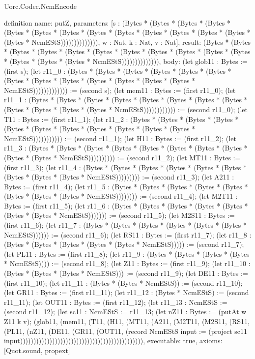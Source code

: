 \begin{lexlean}{Uorc.Codec.NcmEncode}
\begin{semanticmodule}
definition{
  name: putZ,
  parameters: [s : (Bytes * (Bytes * (Bytes * (Bytes * (Bytes * (Bytes * (Bytes * (Bytes * (Bytes * (Bytes * (Bytes * (Bytes * (Bytes * (Bytes * NcmEStS)))))))))))))), w : Nat, k : Nat, v : Nat],
  result: (Bytes * (Bytes * (Bytes * (Bytes * (Bytes * (Bytes * (Bytes * (Bytes * (Bytes * (Bytes * (Bytes * (Bytes * (Bytes * (Bytes * NcmEStS)))))))))))))),
  body: (let glob11 : Bytes := (first s); (let r11_0 : (Bytes * (Bytes * (Bytes * (Bytes * (Bytes * (Bytes * (Bytes * (Bytes * (Bytes * (Bytes * (Bytes * (Bytes * (Bytes * NcmEStS))))))))))))) := (second s); (let mem11 : Bytes := (first r11_0); (let r11_1 : (Bytes * (Bytes * (Bytes * (Bytes * (Bytes * (Bytes * (Bytes * (Bytes * (Bytes * (Bytes * (Bytes * (Bytes * NcmEStS)))))))))))) := (second r11_0); (let T11 : Bytes := (first r11_1); (let r11_2 : (Bytes * (Bytes * (Bytes * (Bytes * (Bytes * (Bytes * (Bytes * (Bytes * (Bytes * (Bytes * (Bytes * NcmEStS))))))))))) := (second r11_1); (let H11 : Bytes := (first r11_2); (let r11_3 : (Bytes * (Bytes * (Bytes * (Bytes * (Bytes * (Bytes * (Bytes * (Bytes * (Bytes * (Bytes * NcmEStS)))))))))) := (second r11_2); (let MT11 : Bytes := (first r11_3); (let r11_4 : (Bytes * (Bytes * (Bytes * (Bytes * (Bytes * (Bytes * (Bytes * (Bytes * (Bytes * NcmEStS))))))))) := (second r11_3); (let A211 : Bytes := (first r11_4); (let r11_5 : (Bytes * (Bytes * (Bytes * (Bytes * (Bytes * (Bytes * (Bytes * (Bytes * NcmEStS)))))))) := (second r11_4); (let M2T11 : Bytes := (first r11_5); (let r11_6 : (Bytes * (Bytes * (Bytes * (Bytes * (Bytes * (Bytes * (Bytes * NcmEStS))))))) := (second r11_5); (let M2S11 : Bytes := (first r11_6); (let r11_7 : (Bytes * (Bytes * (Bytes * (Bytes * (Bytes * (Bytes * NcmEStS)))))) := (second r11_6); (let RS11 : Bytes := (first r11_7); (let r11_8 : (Bytes * (Bytes * (Bytes * (Bytes * (Bytes * NcmEStS))))) := (second r11_7); (let PL11 : Bytes := (first r11_8); (let r11_9 : (Bytes * (Bytes * (Bytes * (Bytes * NcmEStS)))) := (second r11_8); (let Z11 : Bytes := (first r11_9); (let r11_10 : (Bytes * (Bytes * (Bytes * NcmEStS))) := (second r11_9); (let DE11 : Bytes := (first r11_10); (let r11_11 : (Bytes * (Bytes * NcmEStS)) := (second r11_10); (let GR11 : Bytes := (first r11_11); (let r11_12 : (Bytes * NcmEStS) := (second r11_11); (let OUT11 : Bytes := (first r11_12); (let r11_13 : NcmEStS := (second r11_12); (let sc11 : NcmEStS := r11_13; (let nZ11 : Bytes := (putAt w Z11 k v); (glob11, (mem11, (T11, (H11, (MT11, (A211, (M2T11, (M2S11, (RS11, (PL11, (nZ11, (DE11, (GR11, (OUT11, (record NcmEStS {input := (project sc11 input)}))))))))))))))))))))))))))))))))))))))))))))),
  executable: true,
  axioms: [Quot.sound, propext]
}


\end{semanticmodule}
\end{lexlean}
